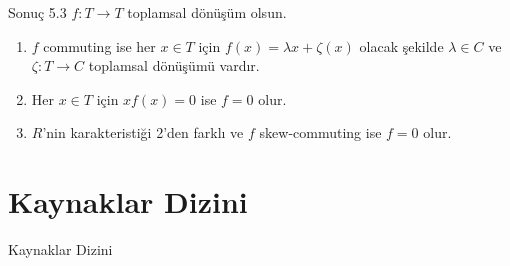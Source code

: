 \documentclass{beamer}
\begin{document}
\begin{frame}

\begin{block}{Sonuç 5.3}
$f \colon T \to T$ toplamsal dönüşüm olsun.
\begin{enumerate}
    \item $f$ commuting ise her $x \in T$ için $f(x) = \lambda x + \zeta(x)$ olacak şekilde $\lambda \in C$ ve $\zeta \colon T \to C$ toplamsal dönüşümü vardır.
    \item Her $x \in T$ için $xf(x) = 0$ ise $f = 0$ olur.
    \item $R$'nin karakteristiği 2'den farklı ve $f$ skew-commuting ise $f = 0$ olur.
\end{enumerate}
\end{block}
    
\end{frame}

\section{Kaynaklar Dizini}

\begin{frame}{Kaynaklar Dizini}
    
\end{frame}
\end{document}
